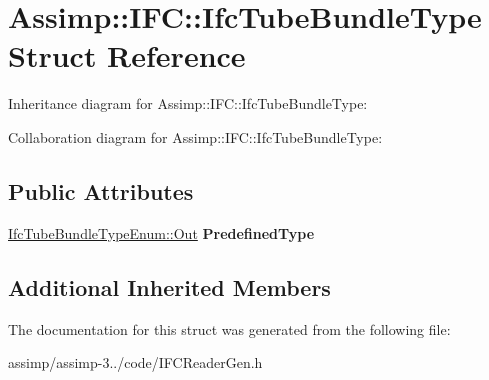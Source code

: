 \hypertarget{struct_assimp_1_1_i_f_c_1_1_ifc_tube_bundle_type}{\section{Assimp\+:\+:I\+F\+C\+:\+:Ifc\+Tube\+Bundle\+Type Struct Reference}
\label{struct_assimp_1_1_i_f_c_1_1_ifc_tube_bundle_type}
}


Inheritance diagram for Assimp\+:\+:I\+F\+C\+:\+:Ifc\+Tube\+Bundle\+Type\+:


Collaboration diagram for Assimp\+:\+:I\+F\+C\+:\+:Ifc\+Tube\+Bundle\+Type\+:
\subsection*{Public Attributes}
\begin{DoxyCompactItemize}
\item 
\hypertarget{struct_assimp_1_1_i_f_c_1_1_ifc_tube_bundle_type_aabdad865bcfd2ba703ee91a9fb084198}{\hyperlink{classboost_1_1shared__ptr}{Ifc\+Tube\+Bundle\+Type\+Enum\+::\+Out} {\bfseries Predefined\+Type}}\label{struct_assimp_1_1_i_f_c_1_1_ifc_tube_bundle_type_aabdad865bcfd2ba703ee91a9fb084198}

\end{DoxyCompactItemize}
\subsection*{Additional Inherited Members}


The documentation for this struct was generated from the following file\+:\begin{DoxyCompactItemize}
\item 
assimp/assimp-\/3../code/I\+F\+C\+Reader\+Gen.\+h\end{DoxyCompactItemize}
